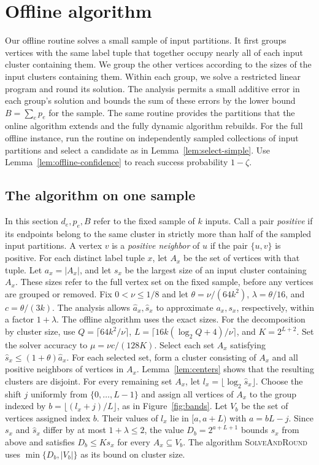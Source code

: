 \documentclass[11pt]{article}
\newcommand{\BandSeed}{\textup{\textsc{SolveAndRound}}}
\begin{document}
\section{Offline algorithm}
\label{sec:offline}
\OfflineMain*

Our offline routine solves a small sample of input partitions. It first groups
vertices with the same label tuple that together occupy nearly all of
each input cluster containing them.
We group the other vertices according to the sizes of the input clusters
containing them. Within each group, we solve a restricted linear program
and round its solution. The analysis permits a small additive error in each group's
solution and bounds the sum of these errors by the lower bound
$B=\sum_e p_e$ for the sample. The same routine provides the partitions that the
online algorithm extends and the fully dynamic algorithm rebuilds.
For the full offline instance, run the routine on independently
sampled collections of input partitions and select a candidate as in Lemma~\ref{lem:select-simple}.
Use Lemma~\ref{lem:offline-confidence} to reach success probability $1-\zeta$.

\subsection{The algorithm on one sample}
\label{sec:size-bands}

In this section $d_e,p_e,B$ refer to the fixed sample of $k$ inputs.
Call a pair \emph{positive} if its endpoints belong to the same cluster in
strictly more than half of the sampled input partitions. A vertex $v$
is a \emph{positive neighbor} of $u$ if the pair $\{u,v\}$ is positive.
For each distinct label tuple $x$, let $A_x$ be the set of vertices
with that tuple. Let $a_x=|A_x|$, and let $s_x$ be the largest size of
an input cluster containing $A_x$. These sizes refer to the full vertex set on the fixed
sample, before any vertices are grouped or removed. Fix $0<\nu\le1/8$
and let $\theta=\nu/(64k^2)$, $\lambda=\theta/16$, and $c=\theta/(3k)$.
The analysis allows $\widehat a_x,\widehat s_x$ to approximate $a_x,s_x$,
respectively, within a factor $1+\lambda$. The offline algorithm
uses the exact sizes.
For the decomposition by cluster size, use $Q=\lceil64k^2/\nu\rceil$,
$L=\lceil16k(\log_2 Q+4)/\nu\rceil$, and $K=2^{L+2}$.
Set the solver accuracy to $\mu=\nu c/(128K)$.
Select each set $A_x$ satisfying
$\widehat s_x\le(1+\theta)\widehat a_x$. For each selected set, form
a cluster consisting of $A_x$ and all positive neighbors of vertices in
$A_x$.
Lemma~\ref{lem:centers} shows that the resulting clusters are disjoint. For every remaining set $A_x$, let
$l_x=\lfloor\log_2\widehat s_x\rfloor$. Choose the shift $j$ uniformly
from $\{0,\ldots,L-1\}$ and assign all vertices of $A_x$ to the group
indexed by $b=\lfloor(l_x+j)/L\rfloor$, as in Figure~\ref{fig:bands}.
Let $V_b$ be the set of vertices assigned index $b$. Their values of
$l_x$ lie in $[a,a+L)$
with $a=bL-j$. Since $s_x$ and $\widehat s_x$ differ by at most
$1+\lambda\le2$, the value $D_b=2^{a+L+1}$ bounds $s_x$ from above
and satisfies $D_b\le K s_x$ for every $A_x\subseteq V_b$. The algorithm \BandSeed{}
uses $\min\{D_b,|V_b|\}$ as its bound on cluster size.
\end{document}
